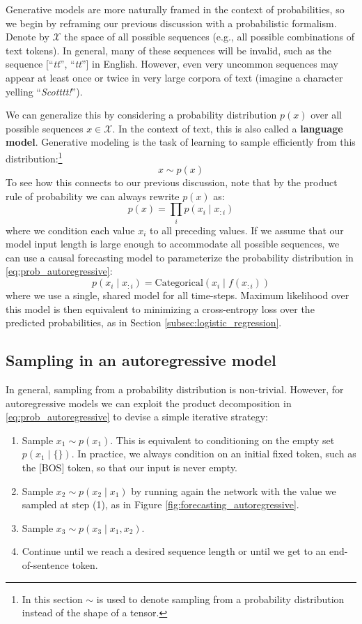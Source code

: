 Generative models are more naturally framed in the context of probabilities, so we begin by reframing our previous discussion with a probabilistic formalism. Denote by $\mathcal{X}$ the space of all possible sequences (e.g., all possible combinations of text tokens). In general, many of these sequences will be invalid, such as the sequence [“\textit{tt}”, “\textit{tt}”] in English. However, even very uncommon sequences may appear at least once or twice in very large corpora of text (imagine a character yelling “\textit{Scotttt!}”). 

We can generalize this by considering a probability distribution $p(x)$ over all possible sequences $x \in \mathcal{X}$. In the context of text, this is also called a \textbf{language model}. Generative modeling is the task of learning to sample efficiently from this distribution:\footnote{In this section $\sim$ is used to denote sampling from a probability distribution instead of the shape of a tensor.}
%
$$
x \sim p(x)
$$
%
To see how this connects to our previous discussion, note that by the product rule of probability we can always rewrite $p(x)$ as:
%
\begin{equation}
p(x)=\prod_ip(x_i \mid x_{:i})
\label{eq:prob_autoregressive}
\end{equation}
%
where we condition each value $x_i$ to all preceding values. If we assume that our model input length is large enough to accommodate all possible sequences, we can use a causal forecasting model to parameterize the probability distribution in \eqref{eq:prob_autoregressive}:
%
$$
p(x_i \mid x_{:i})=\text{Categorical}(x_i\mid f(x_{:i}))
$$
%
where we use a single, shared model for all time-steps. Maximum likelihood over this model is then equivalent to minimizing a cross-entropy loss over the predicted probabilities, as in Section \ref{subsec:logistic_regression}.

\subsection{Sampling in an autoregressive model}

In general, sampling from a probability distribution is non-trivial. However, for autoregressive models we can exploit the product decomposition in \eqref{eq:prob_autoregressive} to devise a simple iterative strategy:
%
\begin{enumerate}
\item Sample $x_1 \sim p(x_1)$. This is equivalent to conditioning on the empty set $p(x_1 \mid \{\})$. In practice, we always condition on an initial fixed token, such as the [BOS] token, so that our input is never empty.
\item Sample $x_2 \sim p(x_2 \mid x_1)$ by running again the network with the value we sampled at step (1), as in Figure \ref{fig:forecasting_autoregressive}.
\item Sample $x_3 \sim p(x_3 \mid x_1, x_2)$.
\item Continue until we reach a desired sequence length or until we get to an end-of-sentence token.
\end{enumerate}


